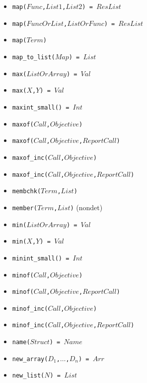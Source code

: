 \documentclass[10pt]{article}
\begin{document}
\begin{multicols}{2}
\begin{scriptsize}
\begin{itemize}
    \item \texttt{map($Func$,$List1$,$List2$) = $ResList$} 
    \item \texttt{map($FuncOrList$,$ListOrFunc$) = $ResList$} 
    \item \texttt{map($Term$)} 
    \item \texttt{map\_to\_list($Map$) = $List$} 
    \item \texttt{max($ListOrArray$) = $Val$} 
    \item \texttt{max($X$,$Y$) = $Val$} 
    \item \texttt{maxint\_small() = $Int$}
    \item \texttt{maxof($Call$,$Objective$)} 
    \item \texttt{maxof($Call$,$Objective$,$ReportCall$)} 
    \item \texttt{maxof\_inc($Call$,$Objective$)} 
    \item \texttt{maxof\_inc($Call$,$Objective$,$ReportCall$)} 
    \item \texttt{membchk($Term$,$List$)} 
    \item \texttt{member($Term$,$List$)} (nondet)
    \item \texttt{min($ListOrArray$) = $Val$} 
    \item \texttt{min($X$,$Y$) = $Val$} 
    \item \texttt{minint\_small() = $Int$}
    \item \texttt{minof($Call$,$Objective$)} 
    \item \texttt{minof($Call$,$Objective$,$ReportCall$)} 
    \item \texttt{minof\_inc($Call$,$Objective$)} 
    \item \texttt{minof\_inc($Call$,$Objective$,$ReportCall$)} 
    \item \texttt{name($Struct$) = $Name$} 
    \item \texttt{new\_array($D_1$,$\ldots$,$D_n$) = $Arr$} 
    \item \texttt{new\_list($N$) = $List$} 

\end{itemize}
\end{scriptsize}
\end{multicols}
\end{document}
